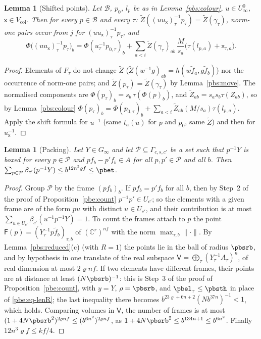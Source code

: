 \documentclass[10pt]{amsart}
\newtheorem{lemma}[theorem]{Lemma}
\theoremstyle{definition}
\theoremstyle{remark}
\newcommand{\C}{\mathbb C}
\begin{document}
\begin{lemma}[Shifted points]\label{pbs:shifted}
Let $\mathcal B$, $p_0$, $l_p$ be as in Lemma~\ref{pbs:colour}, $u\in U^0_\infty$, $\mathsf x\in V_{\mathrm{
col}}$. Then for every $p\in\mathcal B$ and every $\tau$: $\tilde Z((uu_{\mathsf x})^{-1}_\tau p_\tau)=
\tilde Z(\gamma_\tau)$, norm-one pairs occur from $j$ for $(uu_{\mathsf x})_\tau^{-1}p_\tau$, and
\[
\Phi\bigl((uu_{\mathsf x})^{-1}_\tau p_\tau\bigr)_b=\Phi(u_\tau^{-1}p_{0,\tau})_b+\sum_{a<i}\tilde Z(\gamma_
\tau)_{ab}\,\frac M{s_a}\bigl(\tau(l_{p,a})+\mathsf x_{\tau,a}\bigr).
\]
\end{lemma}
\begin{proof}
Elements of $F_\tau$ do not change $\tilde Z$ ($\tilde Z(w^{-1}g)_{ab}=h(w\tilde f_a,g\tilde f_b)$) nor the
occurrence of norm-one pairs; and $\tilde Z(p_\tau)=\tilde Z(\gamma_\tau)$ by Lemma~\ref{pbs:move}. The
normalised components are $\Phi(p_\tau)_b=s_b\,\tau(\Phi(p)_b)$, and $\tilde Z_{ab}=s_as_b\tau(Z_{ab})$, so
by Lemma~\ref{pbs:colour} $\Phi(p_\tau)_b=\Phi(p_{0,\tau})_b+\sum_{a<i}\tilde Z_{ab}(M/s_a)\tau(l_{p,a})$. Apply
the shift formula for $u^{-1}$ (same $t_a(u)$ for $p$ and $p_0$, same $\tilde Z$) and then for $u_{\mathsf
x}^{-1}$.
\end{proof}

\begin{lemma}[Packing]\label{pbs:packing}
Let $Y\in G_\infty$ and let $\mathcal P\subseteq\Gamma_{c,s,c'}$ be a set such that $p^{-1}Y$ is boxed for
every $p\in\mathcal P$ and $pf_b-p'f_b\in A$ for all $p,p'\in\mathcal P$ and all $b$. Then $\sum_{p\in
\mathcal P}\beta_{c'}(p^{-1}Y)\le b^{12n^3\varrho f}\le\pbet$.
\end{lemma}
\begin{proof}
Group $\mathcal P$ by the frame $(pf_b)_b$. If $pf_b=p'f_b$ for all $b$, then by Step~2 of the proof of
Proposition~\ref{pbe:count} $p^{-1}p'\in U_{c'}$; so the elements with a given frame are of the form
$pu$ with distinct $u\in U_{c'}$, and their contribution is at most $\sum_{u\in U_{c'}}\beta_{c'}(u^{-1}
p^{-1}Y)=1$. To count the frames attach to $p$ the point $\mathsf F(p)=(Y_\tau^{-1}p\tilde f_b)_{\tau,b}$ of
$(\C^r)^{nf}$ with the norm $\max_{\tau,b}\|\cdot\|$. By Lemma~\ref{pbs:reduced}(c) (with $R=1$) the
points lie in the ball of radius $\pbsrb$, and by hypothesis in one translate of the real subspace
$\mathsf V=\bigoplus_\tau(Y_\tau^{-1}A_\tau)^n$, of real dimension at most $2\varrho nf$. If two
elements have different frames, their points are at distance at least $(N\pbsrb)^{-1}$: this is
Step~3 of the proof of Proposition~\ref{pbe:count}, with $y=Y$, $\rho=\pbsrb$, and $\pbel_\tau\le\pbsth$
in place of \eqref{pbe:eq-lenR}; the last inequality there becomes $b^{23\varrho+6n+2}(Nb^{37n})^{-1}<1$,
which holds. Comparing volumes in $\mathsf V$, the number of frames is at most $(1+4N\pbsrb^2)^{2\varrho
nf}\le(b^{6n^2})^{2\varrho nf}$, as $1+4N\pbsrb^2\le b^{134n+1}\le b^{6n^2}$. Finally $12n^3\varrho f\le
kf/4$.
\end{proof}
\end{document}
